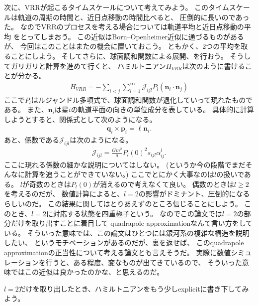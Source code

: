 \documentclass[10pt, pre, twocolumn, showpacs, aps]{revtex4-1}
\begin{document}
次に、VRRが起こるタイムスケールについて考えてみよう。
このタイムスケールは軌道の周期の時間と、近日点移動の時間比べると、
圧倒的に長いのであった。
なのでVRRのプロセスを考える場合については軌道平均と近日点移動の平均
をとってしまおう。
この近似はBorn--Openheimer近似に通づるものがあるが、
今回はこのことはまたの機会に置いておこう。
ともかく、2つの平均を取ることにしよう。
そしてさらに、球面調和関数による展開、を行おう。
そうしてガリガリと計算を進めて行くと、
ハミルトニアン$H_{VRR}$は次のように書けることが分かる。
\begin{align}
H_{VRR}=-\sum_{i<j}\sum_{l=1}^{\infty}\mathcal{J}_{ijl}P_{l}(\pmb{n}_{i}\cdot\pmb{n}_{j})
\end{align}
ここで$P_{l}$はルジャンドル多項式で、球面調和関数が退化していって現れたものである。
また、$\pmb{n}_{i}$は星$i$の軌道平面の向きの単位成分を表している。
具体的に計算しようとすると、関係式として次のようになる。
\begin{align}
\pmb{q}_{i}\times\pmb{p}_{i}=\ell\pmb{n}_{i}.
\end{align}
あと、係数である$\mathcal{J}_{ijl}$は次のようになる。
\begin{align}
\mathcal{J}_{ijl}=\frac{Gm^{2}}{a}P_{l}(0)^{2}s_{ijl}\alpha_{ij}^{l}.
\end{align}
ここに現れる係数の細かな説明についてはしない。
(というか今の段階でまだそんなに計算を追うことができていない。)
ここでとにかく大事なのは$l$の扱いである。
$l$が奇数のときは$P_{l}(0)$が消えるので考えなくて良い。
偶数のときは$l\geq 2$を考えるのだが、
数値計算によると、$l=2$の影響がドミナント、圧倒的になるらしいのだ。
この結果に関してはとりあえずのところ信じることにしよう。
このとき、$l=2$に対応する状態を四重極子という。
なのでこの論文では$l=2$の部分だけを取り出すことに着目して
quadrapole approximationなんて言い方をしている。
そういった意味では、この論文はひとつには銀河系の複雑な構造を説明したい、
というモチベーションがあるのだが、裏を返せば、
このquadrapole approximationの正当性について考える論文とも言えそうだ。
実際に数値シミュレーションを行うと、ある程度、変なものが出てきているので、
そういった意味ではこの近似は良かったのかな、と思えるのだ。

$l=2$だけを取り出したとき、ハミルトニアンをもう少しexplicitに書き下してみよう。
\end{document}
